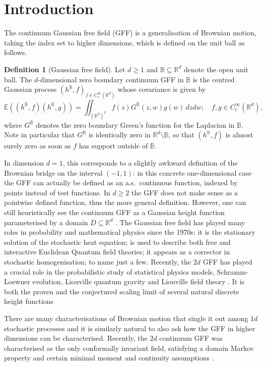 \documentclass[JEP,XML,SOM,Unicode,published]{cedram}
\theoremstyle{definition}
\newtheorem{definition}[theorem]{Definition}
\newcommand{\R}{\mathbb{R}}
\newcommand{\E}{\mathbb{E}}
\newcommand{\B}{\mathbb{B}}\let\D\B\let\Ub\B
\begin{document}
\section{Introduction}
The continuum Gaussian free field (GFF) is a generalisation of Brownian motion, taking the index set to higher dimensions, which is defined on the unit ball as follows.

\begin{definition}[Gaussian free field]
Let $d \geq 1$ and $\D \subseteq \R^d$ denote the open unit ball. The $d$-dimensional zero boundary continuum GFF in $\D$ is the centred Gaussian process $(h^{\D},f)_{f\in C_c^\infty(\R^d)}$ whose covariance is given by
\[
\E((h^{\D},f)(h^{\D},g)) = \iint_{(\R^d)^2} f(z)G^{\B}(z,w)g(w)\, dz dw;\quad f,g\in C_c^\infty(\R^d),
\]
where $G^{\D}$ denotes the zero boundary Green's function for the Laplacian in $\D$. Note in particular that $G^\D$ is identically zero in $\R^d\setminus \D$, so that $(h^\B,f)$ is almost surely zero as soon as $f$ has support outside of $\D$.
\end{definition}

In dimension $d = 1$, this corresponds to a slightly awkward definition of the Brownian bridge on the interval $(-1,1)$: in this concrete one-dimensional case the GFF can actually be defined as an a.s.\ continuous function, \ie indexed by points instead of test functions. In $d \geq 2$ the GFF does not make sense as a pointwise defined function, thus the more general definition. However, one can still heuristically see the continuum GFF as a Gaussian height function parameterised by a domain $D \subseteq \R^d$ \cite{SheffieldGFF}. The Gaussian free field has played many roles in probability and mathematical physics since the 1970s: it is the stationary solution of the stochastic heat equation; is used to describe both free and interactive Euclidean Quantum field theories; it appears as a corrector in stochastic homogenisation; to name just a few. Recently, the $2d$ GFF has played a crucial role in the probabilistic study of statistical physics models, Schramm-Loewner evolution, Liouville quantum gravity and Liouville field theory \cite{Dub, MS3, DS11, DKRV}. It is both the proven and the conjectured scaling limit of several natural discrete height functions \cite{NS, Kenyon_GFF, RiderVirag,BLR}

There are many characterisations of Brownian motion that single it out among $1d$ stochastic processes and it is similarly natural to also ask how the GFF in higher dimensions can be characterised. Recently, the $2d$ continuum GFF was characterised as the only conformally invariant field, satisfying a domain Markov property and certain minimal moment and continuity assumptions \cite{BPR18,BPR20}.
\end{document}
